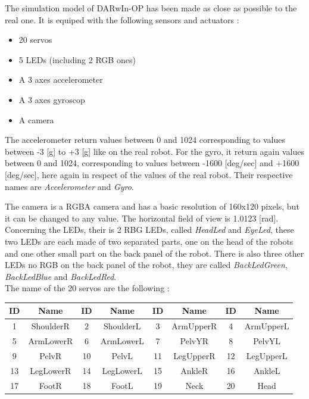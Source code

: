 \documentclass[a4paper, 12pt]{article}  		%
\begin{document}
The simulation model of DARwIn-OP has been made as close as possible to the real one. It is equiped with the following sensors and actuators :
\begin{itemize}
\item 20 servos
\item 5 LEDs (including 2 RGB ones)
\item A 3 axes accelerometer
\item A 3 axes gyroscop
\item A camera
\end{itemize}

The accelerometer return values between 0 and 1024 corresponding to values between -3 [g] to +3 [g] like on the real robot. For the gyro, it return again values between 0 and 1024, corresponding to values between -1600 [deg/sec] and +1600 [deg/sec], here again in respect of the values of the real robot. Their respective names are \textit{Accelerometer} and \textit{Gyro}.

The camera is a RGBA camera and has a basic resolution of 160x120 pixels, but it can be changed to any value. The horizontal field of view is 1.0123 [rad].\\

Concerning the LEDs, their is 2 RBG LEDs, called \textit{HeadLed} and \textit{EyeLed}, these two LEDs are each made of two separated parts, one on the head of the robots and one other small part on the back panel of the robot. There is also three other LEDs no RGB on the back panel of the robot, they are called \textit{BackLedGreen}, \textit{BackLedBlue} and \textit{BackLedRed}.\\

The name of the 20 servos are the following :

\begin{table}[H]
\begin{center}
\begin{tabular}{ | c | c | c | c | c | c | c | c |  }
\hline
ID & Name & ID & Name & ID & Name & ID & Name\\ 
\hline
\hline
1 & ShoulderR & 2 & ShoulderL & 3 & ArmUpperR & 4 & ArmUpperL \\
\hline
5 & ArmLowerR & 6 & ArmLowerL & 7 & PelvYR & 8 & PelvYL \\
\hline
9 & PelvR & 10 & PelvL & 11 & LegUpperR & 12 & LegUpperL \\
\hline
13 & LegLowerR & 14 & LegLowerL & 15 & AnkleR & 16 & AnkleL \\
\hline
17 & FootR & 18 & FootL & 19 & Neck & 20 & Head \\
\hline
\end{tabular}
\label{tab::servosName}
\end{center}
\end{table}
\end{document}
